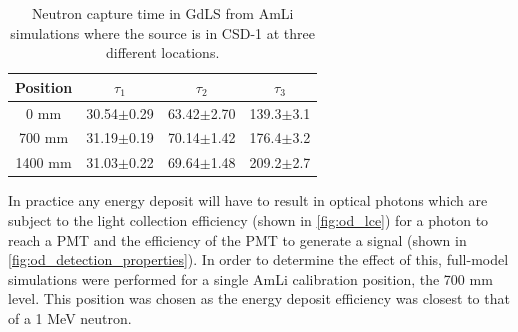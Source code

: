 \begin{table}[]
    \centering
    \begin{tabular}{c|c|c|c}
        Position  &  $\tau_1$      & $\tau_2$       & $\tau_3$        \\ \hline
        0 mm      & 30.54$\pm$0.29 & 63.42$\pm$2.70 & 139.3$\pm$3.1   \\ 
        700 mm    & 31.19$\pm$0.19 & 70.14$\pm$1.42 & 176.4$\pm$3.2   \\
        1400 mm   & 31.03$\pm$0.22 & 69.64$\pm$1.48 & 209.2$\pm$2.7         
    \end{tabular}
    \caption{Neutron capture time in GdLS from AmLi simulations where the source is in CSD-1 at three different locations.}
    \label{tab:simulated_neutron_capture_time}
\end{table}





\par
In practice any energy deposit will have to result in optical photons which are subject to the light collection efficiency (shown in \autoref{fig:od_lce}) for a photon to reach a PMT and the efficiency of the PMT to generate a signal (shown in \autoref{fig:od_detection_properties}).
In order to determine the effect of this, full-model simulations were performed for a single AmLi calibration position, the 700 mm level.
This position was chosen as the energy deposit efficiency was closest to that of a 1 MeV neutron.

